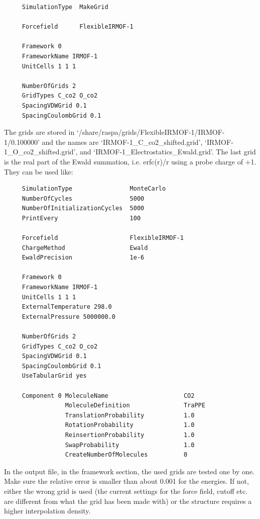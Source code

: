 \begin{tiny}
\begin{verbatim}
     SimulationType  MakeGrid

     Forcefield      FlexibleIRMOF-1

     Framework 0
     FrameworkName IRMOF-1
     UnitCells 1 1 1

     NumberOfGrids 2
     GridTypes C_co2 O_co2
     SpacingVDWGrid 0.1
     SpacingCoulombGrid 0.1
\end{verbatim}
\end{tiny}
\noindent The grids are stored in `/share/raspa/grids/FlexibleIRMOF-1/IRMOF-1/0.100000' and the names are
`IRMOF-1\_C\_co2\_shifted.grid', `IRMOF-1\_O\_co2\_shifted.grid', and `IRMOF-1\_Electrostatics\_Ewald.grid'.
The last grid is the real part of the Ewald summation, i.e. erfc(r)/r using a probe charge of +1.
They can be used like:
\begin{tiny}
\begin{verbatim}
     SimulationType                MonteCarlo
     NumberOfCycles                5000
     NumberOfInitializationCycles  5000
     PrintEvery                    100

     Forcefield                    FlexibleIRMOF-1
     ChargeMethod                  Ewald
     EwaldPrecision                1e-6

     Framework 0
     FrameworkName IRMOF-1
     UnitCells 1 1 1
     ExternalTemperature 298.0
     ExternalPressure 5000000.0

     NumberOfGrids 2
     GridTypes C_co2 O_co2
     SpacingVDWGrid 0.1
     SpacingCoulombGrid 0.1
     UseTabularGrid yes

     Component 0 MoleculeName                     CO2
                 MoleculeDefinition               TraPPE
                 TranslationProbability           1.0
                 RotationProbability              1.0
                 ReinsertionProbability           1.0
                 SwapProbability                  1.0
                 CreateNumberOfMolecules          0
\end{verbatim}
\end{tiny}
In the output file, in the framework section, the used grids are tested one by one.
Make sure the relative error is smaller than about 0.001 for the energies. 
If not, either the wrong grid is used (the current settings for the force field, cutoff etc. are different from what the grid has been made with)
or the structure requires a higher interpolation density.
